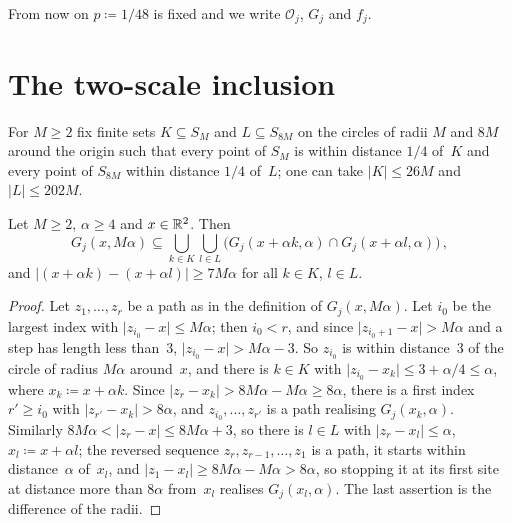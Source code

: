 \documentclass[11pt,letterpaper]{article}
\newcommand{\cO}{\mathcal O}
\begin{document}
From now on $p\coloneqq1/48$ is fixed and we write $\cO_j$, $G_j$ and $f_j$.

\section{The two-scale inclusion}
\label{sec:inclusion}

For $M\ge2$ fix finite sets $K\subseteq S_M$ and $L\subseteq S_{8M}$ on the circles of radii $M$ and $8M$ around the origin such that every point of $S_M$ is within distance $1/4$ of~$K$ and every point of $S_{8M}$ within distance $1/4$ of~$L$; one can take $\lvert K\rvert\le26M$ and $\lvert L\rvert\le202M$.

\begin{lemma}
\label{lem:inclusion}
Let $M\ge2$, $\alpha\ge4$ and $x\in\mathbb R^2$. Then
\begin{equation}
\label{eq:inclusion}
  G_j(x,M\alpha)\subseteq\bigcup_{k\in K}\bigcup_{l\in L}\bigl(G_j(x+\alpha k,\alpha)\cap G_j(x+\alpha l,\alpha)\bigr)\,,
\end{equation}
and $\lvert(x+\alpha k)-(x+\alpha l)\rvert\ge7M\alpha$ for all $k\in K$, $l\in L$.
\end{lemma}

\begin{proof}
Let $z_1,\dots,z_r$ be a path as in the definition of $G_j(x,M\alpha)$. Let $i_0$ be the largest index with $\lvert z_{i_0}-x\rvert\le M\alpha$; then $i_0<r$, and since $\lvert z_{i_0+1}-x\rvert>M\alpha$ and a step has length less than~$3$, $\lvert z_{i_0}-x\rvert>M\alpha-3$. So $z_{i_0}$ is within distance~$3$ of the circle of radius $M\alpha$ around~$x$, and there is $k\in K$ with $\lvert z_{i_0}-x_k\rvert\le3+\alpha/4\le\alpha$, where $x_k\coloneqq x+\alpha k$. Since $\lvert z_r-x_k\rvert>8M\alpha-M\alpha\ge8\alpha$, there is a first index $r'\ge i_0$ with $\lvert z_{r'}-x_k\rvert>8\alpha$, and $z_{i_0},\dots,z_{r'}$ is a path realising $G_j(x_k,\alpha)$. Similarly $8M\alpha<\lvert z_r-x\rvert\le8M\alpha+3$, so there is $l\in L$ with $\lvert z_r-x_l\rvert\le\alpha$, $x_l\coloneqq x+\alpha l$; the reversed sequence $z_r,z_{r-1},\dots,z_1$ is a path, it starts within distance~$\alpha$ of~$x_l$, and $\lvert z_1-x_l\rvert\ge8M\alpha-M\alpha>8\alpha$, so stopping it at its first site at distance more than $8\alpha$ from~$x_l$ realises $G_j(x_l,\alpha)$. The last assertion is the difference of the radii.
\end{proof}
\end{document}
